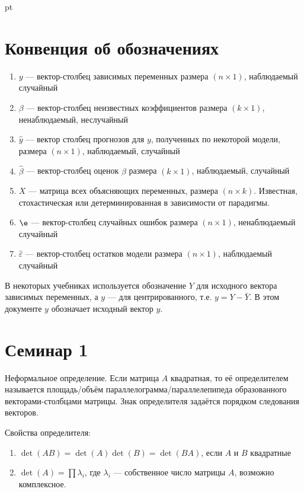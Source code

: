 \documentclass[pdftex,12pt,a4paper]{article}
\def \hb{\hat{\beta}}
\def \hy{\hat{y}}
\def \he{\hat{\varepsilon}}
\begin{document}
 pt %

\listoftodos

\section{Конвенция об обозначениях}

\begin{enumerate}
\item $y$ --- вектор-столбец зависимых переменных размера $(n \times 1)$, наблюдаемый случайный

\item $\beta$ --- вектор-столбец неизвестных коэффициентов размера $(k \times 1)$, ненаблюдаемый, неслучайный

\item $\hy$ --- вектор столбец прогнозов для $y$, полученных по некоторой модели, размера $(n \times 1)$, наблюдаемый, случайный

\item $\hb$ --- вектор-столбец оценок $\beta$ размера $(k \times 1)$, наблюдаемый, случайный

\item $X$ --- матрица всех объясняющих переменных, размера $(n \times k)$. Известная, стохастическая или детерминированная в зависимости от парадигмы.

\item $\e$ --- вектор-столбец случайных ошибок размера $(n \times 1)$, ненаблюдаемый случайный

\item $\he$ --- вектор-столбец остатков модели размера $(n \times 1)$, наблюдаемый случайный
\end{enumerate}

В некоторых учебниках используется обозначение $Y$ для исходного вектора зависимых переменных, а $y$ --- для центрированного, т.е.  $y=Y-\bar{Y}$. В этом документе $y$ обозначает исходный вектор $y$. 


\section{Семинар 1}

Неформальное определение. Если матрица $A$ квадратная, то её определителем называется площадь/объём параллелограмма/параллелепипеда образованного векторами-столбцами матрицы. Знак определителя задаётся порядком следования векторов. 


Свойства определителя:
\begin{enumerate}
\item $\det(AB)=\det(A)\det(B)=\det(BA)$, если $A$ и $B$ квадратные
\item $\det(A)=\prod \lambda_i$, где $\lambda_i$ --- собственное число матрицы $A$, возможно комплексное.
\end{enumerate}
\end{document}
